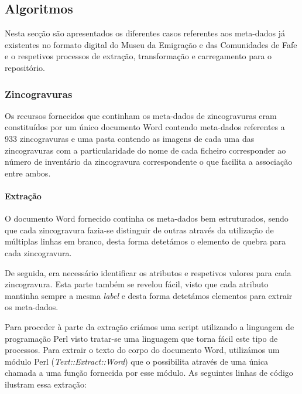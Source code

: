 \documentclass[letterpaper]{article}
\begin{document}
\bigskip


\bigskip


\bigskip

\subsection[Algoritmos]{ Algoritmos}
{
Nesta sec\c{c}\~ao s\~ao apresentados os diferentes casos referentes aos
meta-dados j\'a existentes no formato digital do Museu da
Emigra\c{c}\~ao e das Comunidades de Fafe e o respetivos processos de
extra\c{c}\~ao, transforma\c{c}\~ao e carregamento para o
reposit\'orio.}

\subsubsection[Zincogravuras]{ Zincogravuras}
{
Os recursos fornecidos que continham os meta-dados de zincogravuras eram
constitu\'idos por um \'unico documento Word contendo meta-dados
referentes a 933 zincogravuras e uma pasta contendo as imagens de cada
uma das zincogravuras com a particularidade do nome de cada ficheiro
corresponder ao n\'umero de invent\'ario da zincogravura correspondente
o que facilita a associa\c{c}\~ao entre ambos.}

\paragraph[Extra\c{c}\~ao]{ Extra\c{c}\~ao}
{
O documento Word fornecido continha os meta-dados bem estruturados,
sendo que cada zincogravura fazia-se distinguir de outras atrav\'es da
utiliza\c{c}\~ao de m\'ultiplas linhas em branco, desta forma
detet\'amos o elemento de quebra para cada zincogravura. }

{
De seguida, era necess\'ario identificar os atributos e respetivos
valores para cada zincogravura. Esta parte tamb\'em se revelou f\'acil,
visto que cada atributo mantinha sempre a mesma \textit{label} e desta
forma detet\'amos elementos para extrair os meta-dados.}


\bigskip

{
Para proceder \`a parte da extra\c{c}\~ao cri\'amos uma script
utilizando a linguagem de programa\c{c}\~ao Perl visto tratar-se uma
linguagem que torna f\'acil este tipo de processos. Para extrair o
texto do corpo do documento Word, utiliz\'amos um m\'odulo Perl
(\textit{Text::Extract::Word}) que o possibilita atrav\'es de uma
\'unica chamada a uma fun\c{c}\~ao fornecida por esse m\'odulo. As
seguintes linhas de c\'odigo ilustram essa extra\c{c}\~ao:}
\end{document}
